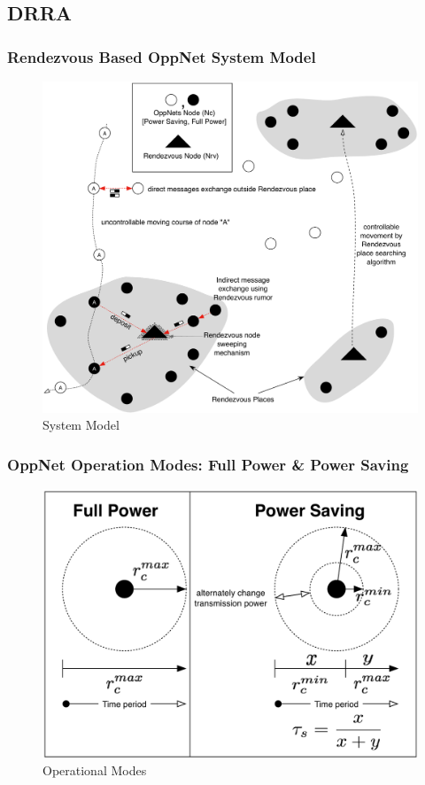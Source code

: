 \documentclass{beamer}
\begin{document}
\subsection{DRRA}
\begin{frame}
	\frametitle{Rendezvous Based OppNet System Model}
	\begin{figure}
\centering
\includegraphics[width=0.7\linewidth]{Figures/NewSystemModel}
\caption{System Model}
\label{fig:NewSystemModel}
\end{figure}
\end{frame}
\begin{frame}
	\frametitle{OppNet Operation Modes: Full Power \& Power Saving}
	\begin{figure}
\centering
\includegraphics[width=0.7\linewidth]{Figures/OperationalMode}
\caption{Operational Modes}
\label{fig:OperationalMode}
\end{figure}
\end{frame}
\end{document}
